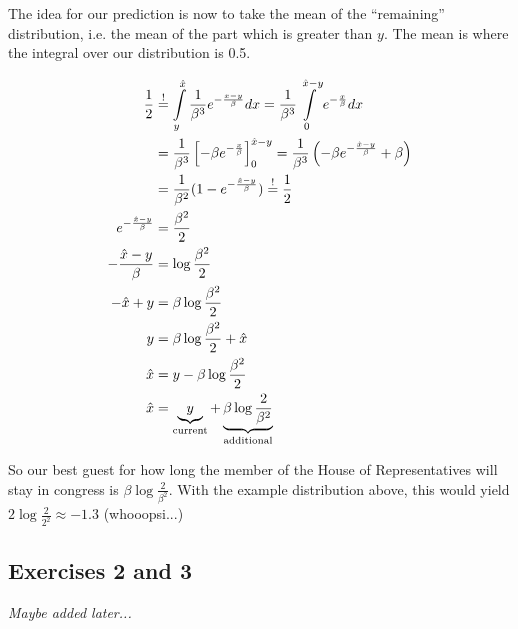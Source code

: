 \documentclass[../main/Notes.tex]{subfiles}
\begin{document}
The idea for our prediction is now to take the mean of the ``remaining'' distribution, i.e. the mean of the part which is greater than $y$. The mean is where the integral over our distribution is 0.5.

\begin{align*}
\frac{1}{2} &\stackrel{!}{=} \int\limits_y^{\est{x}} \frac{1}{\beta^3} e^{-\frac{x-y}{\beta} } dx = \frac{1}{\beta^3} \int\limits_0^{\est{x}-y} e^{-\frac{x}{\beta}} dx \\
&= \frac{1}{\beta^3} \left[-\beta e^{-\frac{x}{\beta}}\right]_0^{\est{x}-y} = \frac{1}{\beta^3} \left( -\beta e^{-\frac{\est{x}-y}{\beta}} + \beta \right) \\
&= \frac{1}{\beta^2}( 1 - e^{-\frac{\est{x}-y}{\beta}}) \stackrel{!}{=} \frac{1}{2} \\
e^{-\frac{\est{x}-y}{\beta}} &= \frac{\beta^2}{2} \\
-\frac{\est{x}-y}{\beta} &= \log {\frac{\beta^2}{2}} \\
-\est{x}+y &= \beta \log{ \frac{\beta^2}{2} } \\
y &= \beta \log{ \frac{\beta^2}{2} } + \est{x}\\
\est{x} &= y-\beta \log{ \frac{\beta^2}{2} } \\
\est{x} &= \underbrace{y}_{\text{current}}+\underbrace{\beta \log{\frac{2}{\beta^2}}}_{\text{additional}}
\end{align*}

So our best guest for how long the member of the House of Representatives will stay in congress is $\beta \log{\frac{2}{\beta^2}}$. With the example distribution above, this would yield $2 \log{\frac{2}{2^2}} \approx -1.3$ (whooopsi...)



\subsection*{Exercises 2 and 3}
\emph{Maybe added later...}
\end{document}
